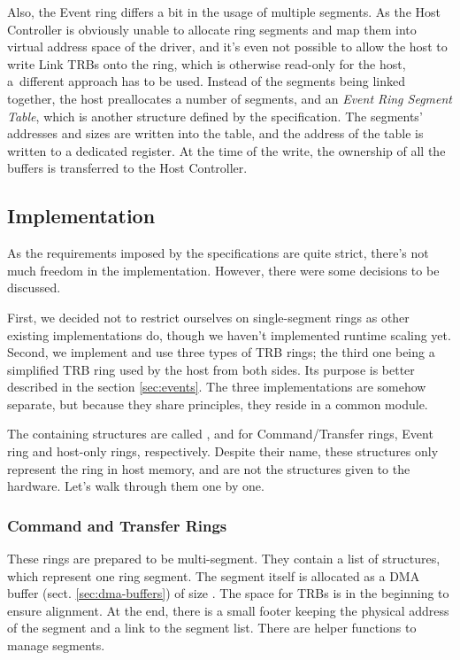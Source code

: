 Also, the Event ring differs a bit in the usage of multiple segments. As the
Host Controller is obviously unable to allocate ring segments and map them into
virtual address space of the driver, and it's even not possible to allow the
host to write Link TRBs onto the ring, which is otherwise read-only for the
host, a~different approach has to be used. Instead of the segments being linked
together, the host preallocates a number of segments, and an \emph{Event Ring
Segment Table}, which is another structure defined by the specification. The
segments' addresses and sizes are written into the table, and the address of
the table is written to a dedicated register. At the time of the write, the
ownership of all the buffers is transferred to the Host Controller.

\subsection{Implementation}

As the requirements imposed by the specifications are quite strict, there's not
much freedom in the implementation. However, there were some decisions to be
discussed.

First, we decided not to restrict ourselves on single-segment rings as
other existing implementations do, though we haven't implemented runtime
scaling yet. Second, we implement and use three types of TRB rings;
the third one being a simplified TRB ring used by the host from both sides. Its
purpose is better described in the section \ref{sec:events}. The three
implementations are somehow separate, but because they share principles, they
reside in a common module.

The containing structures are called ,
 and  for Command/Transfer
rings, Event ring and host-only rings, respectively. Despite their name, these
structures only represent the ring in host memory, and are not the structures
given to the hardware. Let's walk through them one by one.

\subsubsection{Command and Transfer Rings}

These rings are prepared to be multi-segment. They contain a list of
 structures, which represent one ring segment. The
segment itself is allocated as a DMA buffer (sect. \ref{sec:dma-buffers}) of
size . The space for TRBs is in the beginning to ensure
alignment. At the end, there is a small footer keeping the physical address of
the segment and a link to the segment list. There are helper functions to
manage segments.

